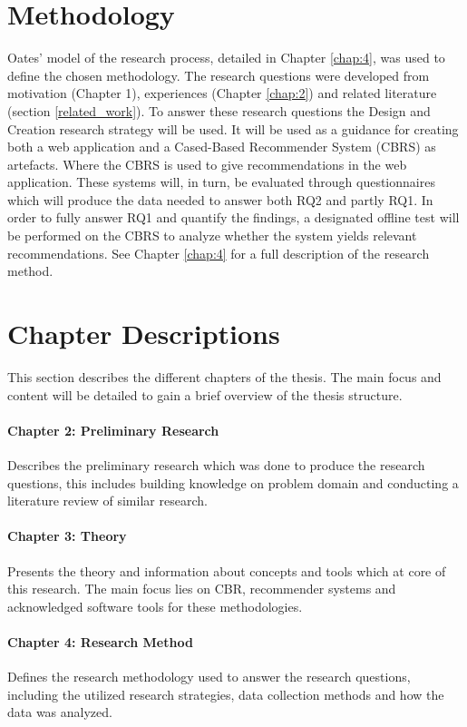 \section{Methodology}
Oates' \cite{oates2005researching} model of the research process, detailed in Chapter \ref{chap:4}, was used to define the chosen methodology. The research questions were developed from motivation (Chapter 1), experiences (Chapter \ref{chap:2}) and related literature (section \ref{related_work}).
To answer these research questions the Design and Creation research strategy will be used. It will be used as a guidance for creating both a web application and a Cased-Based Recommender System (CBRS) as artefacts. Where the CBRS is used to give recommendations in the web application. These systems will, in turn, be evaluated through questionnaires which will produce the data needed to answer both RQ2 and partly RQ1. In order to fully answer RQ1 and quantify the findings, a designated offline test will be performed on the CBRS to analyze whether the system yields relevant recommendations. See Chapter \ref{chap:4} for a full description of the research method.


\section{Chapter Descriptions}
This section describes the different chapters of the thesis. The main focus and content will be detailed to gain a brief overview of the thesis structure.

\paragraph{Chapter 2: Preliminary Research}
Describes the preliminary research which was done to produce the research questions, this includes building knowledge on problem domain and conducting a literature review of similar research.

\paragraph{Chapter 3: Theory}
Presents the theory and information about concepts and tools which at core of this research. The main focus lies on CBR, recommender systems and acknowledged software tools for these methodologies. 

\paragraph{Chapter 4: Research Method}
Defines the research methodology used to answer the research questions, including the utilized research strategies, data collection methods and how the data was analyzed. 

